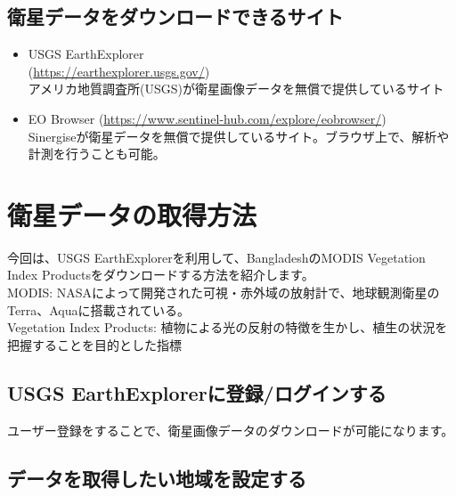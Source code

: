 \documentclass[
]{book}
\begin{document}
\hypertarget{ux885bux661fux30c7ux30fcux30bfux3092ux30c0ux30a6ux30f3ux30edux30fcux30c9ux3067ux304dux308bux30b5ux30a4ux30c8}{%
\section{衛星データをダウンロードできるサイト}\label{ux885bux661fux30c7ux30fcux30bfux3092ux30c0ux30a6ux30f3ux30edux30fcux30c9ux3067ux304dux308bux30b5ux30a4ux30c8}}

\begin{itemize}
\item
  USGS EarthExplorer\\
  (\url{https://earthexplorer.usgs.gov/})\\
  アメリカ地質調査所(USGS)が衛星画像データを無償で提供しているサイト　　
\item
  EO Browser
  (\url{https://www.sentinel-hub.com/explore/eobrowser/})\\
  Sinergiseが衛星データを無償で提供しているサイト。ブラウザ上で、解析や計測を行うことも可能。
\end{itemize}

\hypertarget{ux885bux661fux30c7ux30fcux30bfux306eux53d6ux5f97ux65b9ux6cd5}{%
\chapter{衛星データの取得方法}\label{ux885bux661fux30c7ux30fcux30bfux306eux53d6ux5f97ux65b9ux6cd5}}

今回は、USGS EarthExplorerを利用して、BangladeshのMODIS Vegetation Index Productsをダウンロードする方法を紹介します。\\
MODIS: NASAによって開発された可視・赤外域の放射計で、地球観測衛星のTerra、Aquaに搭載されている。\\
Vegetation Index Products: 植物による光の反射の特徴を生かし、植生の状況を把握することを目的とした指標

\hypertarget{usgs-earthexplorerux306bux767bux9332ux30edux30b0ux30a4ux30f3ux3059ux308b}{%
\section{USGS EarthExplorerに登録/ログインする}\label{usgs-earthexplorerux306bux767bux9332ux30edux30b0ux30a4ux30f3ux3059ux308b}}

ユーザー登録をすることで、衛星画像データのダウンロードが可能になります。

\hypertarget{ux30c7ux30fcux30bfux3092ux53d6ux5f97ux3057ux305fux3044ux5730ux57dfux3092ux8a2dux5b9aux3059ux308b}{%
\section{データを取得したい地域を設定する}\label{ux30c7ux30fcux30bfux3092ux53d6ux5f97ux3057ux305fux3044ux5730ux57dfux3092ux8a2dux5b9aux3059ux308b}}
\end{document}
